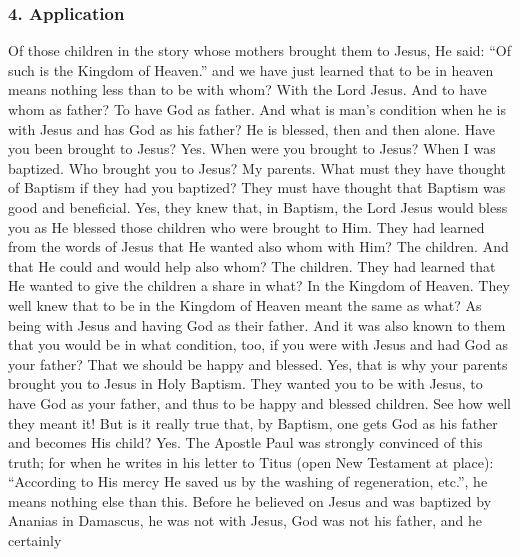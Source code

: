 \subsubsection{4. Application} Of those children in the story whose mothers brought them to Jesus, He said: “Of such is the Kingdom of Heaven.” and we have just learned that to be in heaven means nothing less than to be with whom? With the Lord Jesus. And to have whom as father? To have God as father. And what is man's condition when he is with Jesus and has God as his father? He is blessed, then and then alone. Have you been brought to Jesus? Yes. When were you brought to Jesus? When I was baptized. Who brought you to Jesus? My parents. What must they have thought of Baptism if they had you baptized? They must have thought that Baptism was good and beneficial. Yes, they knew that, in Baptism, the Lord Jesus would bless you as He blessed those children who were brought to Him. They had learned from the words of Jesus that He wanted also whom with Him? The children. And that He could and would help also whom? The children. They had learned that He wanted to give the children a share in what? In the Kingdom of Heaven. They well knew that to be in the Kingdom of Heaven meant the same as what? As being with Jesus and having God as their father. And it was also known to them that you would be in what condition, too, if you were with Jesus and had God as your father? That we should be happy and blessed. Yes, that is why your parents brought you to Jesus in Holy Baptism. They wanted you to be with Jesus, to have God as your father, and thus to be happy and blessed children. See how well they meant it! But is it really true that, by Baptism, one gets God as his father and becomes His child? Yes. The Apostle Paul was strongly convinced of this truth; for when he writes in his letter to Titus (open New Testament at place): “According to His mercy He saved us by the washing of regeneration, etc.”, he means nothing else than this. Before he believed on Jesus and was baptized by Ananias in Damascus, he was not with Jesus, God was not his father, and he certainly
